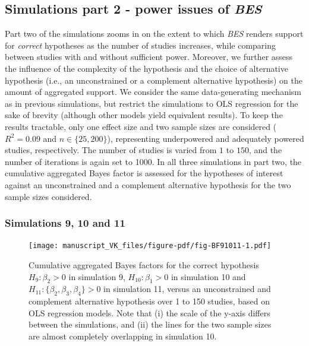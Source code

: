 \documentclass[
]{interact}
\begin{document}
\hypertarget{simulations-part-2---power-issues-of-bes}{%
\subsection{\texorpdfstring{Simulations part 2 - power issues of
\emph{BES}}{Simulations part 2 - power issues of BES}}\label{simulations-part-2---power-issues-of-bes}}

Part two of the simulations zooms in on the extent to which \emph{BES}
renders support for \emph{correct} hypotheses as the number of studies
increases, while comparing between studies with and without sufficient
power. Moreover, we further assess the influence of the complexity of
the hypothesis and the choice of alternative hypothesis (i.e., an
unconstrained or a complement alternative hypothesis) on the amount of
aggregated support. We consider the same data-generating mechanism as in
previous simulations, but restrict the simulations to OLS regression for
the sake of brevity (although other models yield equivalent results). To
keep the results tractable, only one effect size and two sample sizes
are considered (\(R^2 = 0.09\) and \(n \in \{25, 200\}\)), representing
underpowered and adequately powered studies, respectively. The number of
studies is varied from \(1\) to \(150\), and the number of iterations is
again set to 1000. In all three simulations in part two, the cumulative
aggregated Bayes factor is assessed for the hypotheses of interest
against an unconstrained and a complement alternative hypothesis for the
two sample sizes considered.

\hypertarget{simulations-9-10-and-11}{%
\subsubsection{Simulations 9, 10 and 11}\label{simulations-9-10-and-11}}

\begin{figure}[!h]

{\centering \texttt{[image: manuscript\_VK\_files/figure-pdf/fig-BF91011-1.pdf]}

}

\caption{\label{fig-BF91011}Cumulative aggregated Bayes factors for the
correct hypothesis \(H_9: \beta_2 > 0\) in simulation 9,
\(H_{10}: \beta_1 > 0\) in simulation 10 and
\(H_{11}: \{\beta_2, \beta_3, \beta_4\} > 0\) in simulation 11, versus
an unconstrained and complement alternative hypothesis over 1 to 150
studies, based on OLS regression models. Note that (i) the scale of the
y-axis differs between the simulations, and (ii) the lines for the two
sample sizes are almost completely overlapping in simulation 10.}

\end{figure}
\end{document}
